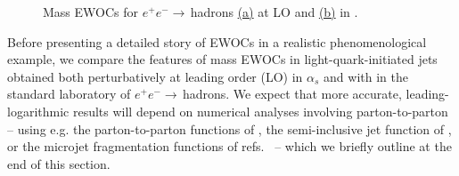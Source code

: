 \begin{figure}
    \hspace{-20pt}
    \caption[Mass EWOCs for \(e^+ e^- \to \,\)hadrons at LO and in \pythia{}.]
    {
        Mass EWOCs for \(e^+ e^- \to \,\)hadrons \hyperref[fig:ee2hadrons:lo]{(a)} at LO and \hyperref[fig:ee2hadrons:pythia]{(b)} in \pythia{}.
    }
    \label{fig:EWOCs:ee2hadrons}
\end{figure}

Before presenting a detailed story of EWOCs in a realistic phenomenological example, we compare the features of mass EWOCs in light-quark-initiated jets obtained both perturbatively at leading order (LO) in $\alpha_s$ and with \pythia{} in the standard laboratory of \(e^+ e^-\to\,\)hadrons.
%
We expect that more accurate, leading-logarithmic results will depend on numerical analyses involving \gls{parton-to-parton} -- using e.g. the \gls{parton-to-parton} functions of , the semi-inclusive jet function of , or the microjet fragmentation functions of refs.~\cite{Dasgupta:2014yra,Dasgupta:2016bnd} -- which we briefly outline at the end of this section.

